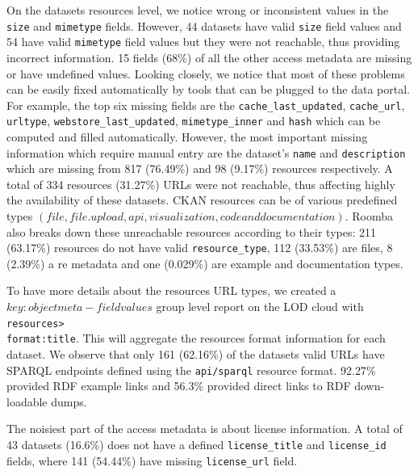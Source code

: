 \documentclass[runningheads,a4paper]{../../Util/LaTEX/llncs}
\begin{document}
On the datasets resources level, we notice wrong or inconsistent values in the \texttt{size} and \texttt{mimetype} fields. However, 44 datasets have valid \texttt{size} field values and 54 have valid \texttt{mimetype} field values but they were not reachable, thus providing incorrect information. 15 fields (68\%) of all the other access metadata are missing or have undefined values. Looking closely, we notice that most of these problems can be easily fixed automatically by tools that can be plugged to the data portal. For example, the top six missing fields are the \texttt{cache\_last\_updated}, \texttt{cache\_url}, \texttt{url\-type}, \texttt{webstore\_last\_updated}, \texttt{mimetype\-\_inner} and \texttt{hash} which can be computed and filled automatically. However, the most important missing information which require manual entry are the dataset's \texttt{name} and \texttt{description} which are missing from 817 (76.49\%) and 98 (9.17\%) resources respectively. A total of 334 resources (31.27\%) URLs were not reachable, thus affecting highly the availability of these datasets. CKAN resources can be of various predefined types $(file, file.upload, api, visualization, code and documentation)$. Roomba also breaks down these unreachable resources according to their types: 211 (63.17\%) resources do not have valid \texttt{resource\_type}, 112 (33.53\%) are files, 8 (2.39\%) a re metadata and one (0.029\%) are example and documentation types.

To have more details about the resources URL types, we created a $key:object meta-field values$ group level report on the LOD cloud with \texttt{resources>\\format:title}. This will aggregate the resources format information for each dataset. We observe that only 161 (62.16\%) of the datasets valid URLs have SPARQL endpoints defined using the \texttt{api/sparql} resource format. 92.27\% provided RDF example links and 56.3\% provided direct links to RDF down-loadable dumps.

The noisiest part of the access metadata is about license information. A total of 43 datasets (16.6\%) does not have a defined \texttt{license\_title} and \texttt{license\_id} fields, where 141 (54.44\%) have missing \texttt{license\_url} field.
\end{document}
